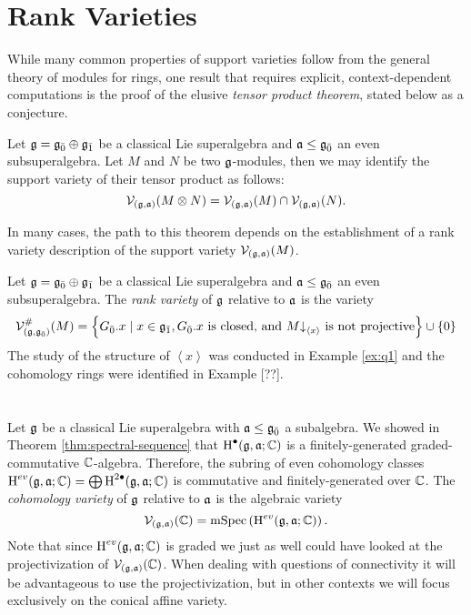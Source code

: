 \section{Rank Varieties}
\label{sec:rank-varieties}

While many common properties of support varieties follow from the general theory of modules for rings, one result that requires explicit, context-dependent computations is the proof of the elusive \emph{tensor product theorem}, stated below as a conjecture.

\begin{conjecture}
  \label{conj:tpt}
  Let $\mathfrak{g} = {\mathfrak{g}}_{\bar{0}} \oplus {\mathfrak{g}}_{\bar{1}}$ be a classical Lie superalgebra and $\mathfrak{a} \leq {\mathfrak{g}}_{\bar{0}}$ an even subsuperalgebra. Let $M$ and $N$ be two $\mathfrak{g}$-modules, then we may identify the support variety of their tensor product as follows:
  \[
    \mathcal{V}_{(\mathfrak{g},\mathfrak{a})}(M \otimes N) = \mathcal{V}_{(\mathfrak{g},\mathfrak{a})}(M) \cap \mathcal{V}_{(\mathfrak{g},\mathfrak{a})}(N).
  \]
\end{conjecture}

In many cases, the path to this theorem depends on the establishment of a rank variety description of the support variety $\mathcal{V}_{(\mathfrak{g},\mathfrak{a})}(M)$.

\begin{definition}
  \label{def:rank-variety}
  Let $\mathfrak{g} = {\mathfrak{g}}_{\bar{0}} \oplus {\mathfrak{g}}_{\bar{1}}$ be a classical Lie superalgebra and $\mathfrak{a} \leq {\mathfrak{g}}_{\bar{0}}$ an even subsuperalgebra. The \emph{rank variety} of $\mathfrak{g}$ relative to $\mathfrak{a}$ is the variety
  \[
    \mathcal{V}_{(\mathfrak{g},{\mathfrak{g}}_{\bar{0}})}^\#(M) = \left\{ {G}_{\bar{0}}.x \mid x \in {\mathfrak{g}}_{\bar{1}}, {G}_{\bar{0}}.x \text{ is closed, and } M\mathord{\downarrow}_{\left<x\right>}\text{ is not projective}  \right\} \cup \{0\}
  \]
  The study of the structure of $\left<x\right>$ was conducted in Example \ref{ex:q1} and the cohomology rings were identified in Example [??]. 
\end{definition}

\section{}Let $\mathfrak{g}$ be a classical Lie superalgebra with $\mathfrak{a} \leq {\mathfrak{g}}_{\bar{0}}$ a subalgebra. We showed in Theorem \ref{thm:spectral-sequence} that $\operatorname{H}^\bullet(\mathfrak{g},\mathfrak{a};\mathbb{C})$ is a finitely-generated graded-commutative $\mathbb{C}$-algebra. Therefore, the subring of even cohomology classes $\operatorname{H}^{ev}(\mathfrak{g},\mathfrak{a};\mathbb{C}) = \bigoplus \operatorname{H}^{2\bullet}(\mathfrak{g},\mathfrak{a};\mathbb{C})$ is commutative and finitely-generated over $\mathbb{C}$. The \textit{cohomology variety} of $\mathfrak{g}$ relative to $\mathfrak{a}$ is the algebraic variety
\[
  \mathcal{V}_{(\mathfrak{g},\mathfrak{a})}(\mathbb{C}) = \operatorname{mSpec}\left(\operatorname{H}^{ev}(\mathfrak{g},\mathfrak{a};\mathbb{C})\right).
\]
Note that since $\operatorname{H}^{ev}(\mathfrak{g},\mathfrak{a};\mathbb{C})$ is graded we just as well could have looked at the projectivization of $\mathcal{V}_{(\mathfrak{g},\mathfrak{a})}(\mathbb{C})$. When dealing with questions of connectivity it will be advantageous to use the projectivization, but in other contexts we will focus exclusively on the conical affine variety.

